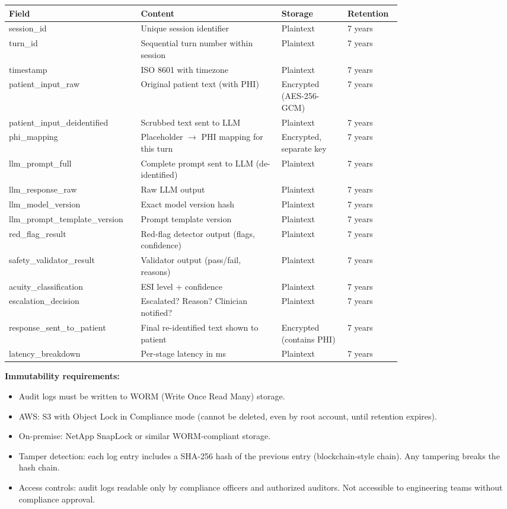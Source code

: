 {\small
\begin{tabular}{|p{0.2\linewidth}|p{0.32\linewidth}|p{0.15\linewidth}|p{0.1\linewidth}|}
\hline
\textbf{Field} & \textbf{Content} & \textbf{Storage} & \textbf{Retention} \\
\hline
session\_id & Unique session identifier & Plaintext & 7 years \\
\hline
turn\_id & Sequential turn number within session & Plaintext & 7 years \\
\hline
timestamp & ISO 8601 with timezone & Plaintext & 7 years \\
\hline
patient\_input\_raw & Original patient text (with PHI) & Encrypted (AES-256-GCM) & 7 years \\
\hline
patient\_input\_deidentified & Scrubbed text sent to LLM & Plaintext & 7 years \\
\hline
phi\_mapping & Placeholder $\rightarrow$ PHI mapping for this turn & Encrypted, separate key & 7 years \\
\hline
llm\_prompt\_full & Complete prompt sent to LLM (de-identified) & Plaintext & 7 years \\
\hline
llm\_response\_raw & Raw LLM output & Plaintext & 7 years \\
\hline
llm\_model\_version & Exact model version hash & Plaintext & 7 years \\
\hline
llm\_prompt\_template\_version & Prompt template version & Plaintext & 7 years \\
\hline
red\_flag\_result & Red-flag detector output (flags, confidence) & Plaintext & 7 years \\
\hline
safety\_validator\_result & Validator output (pass/fail, reasons) & Plaintext & 7 years \\
\hline
acuity\_classification & ESI level + confidence & Plaintext & 7 years \\
\hline
escalation\_decision & Escalated? Reason? Clinician notified? & Plaintext & 7 years \\
\hline
response\_sent\_to\_patient & Final re-identified text shown to patient & Encrypted (contains PHI) & 7 years \\
\hline
latency\_breakdown & Per-stage latency in ms & Plaintext & 7 years \\
\hline
\end{tabular}
}

\bigskip
\textbf{Immutability requirements:}
\begin{itemize}
  \item Audit logs must be written to WORM (Write Once Read Many) storage.
  \item AWS: S3 with Object Lock in Compliance mode (cannot be deleted, even by root account, until retention expires).
  \item On-premise: NetApp SnapLock or similar WORM-compliant storage.
  \item Tamper detection: each log entry includes a SHA-256 hash of the previous entry (blockchain-style chain). Any tampering breaks the hash chain.
  \item Access controls: audit logs readable only by compliance officers and authorized auditors. Not accessible to engineering teams without compliance approval.
\end{itemize}

